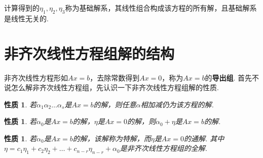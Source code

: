 \documentclass[12pt, a4paper, oneside]{ctexbook}
\newtheorem{quolity}[theorem]{性质}
\begin{document}
计算得到的$\eta_1, \eta_2, \eta_3$称为基础解系，其线性组合构成该方程的所有解，且基础解系是线性无关的. 

\section{非齐次线性方程组解的结构}

非齐次线性方程形如$Ax = b$，去除常数得到$Ax = 0$，称为$Ax = b$的\textbf{导出组}. 
首先不说怎么解非齐次线性方程组，先认识一下非齐次线性方程组解的性质. 

\begin{quolity}
    若$\alpha_1 \alpha_2 \dots \alpha_s$是$Ax=b$的解，则任意$\alpha$相加减仍为该方程的解. 
\end{quolity}

\begin{quolity}
    若$\alpha_0$是$Ax=b$的解，$\eta$是$Ax=0$的解，则$\alpha_0+\eta$是$Ax=b$的解. 
\end{quolity}

\begin{quolity}
    若$\alpha_0$是$Ax=b$的解，该解称为特解，而$\eta$是$Ax=0$的通解. 
    其中$\eta = c_1\eta_1 + c_2\eta_2 + \dots + c_{n-r}\eta_{n-r} + \alpha_0$是非齐次线性方程组的全解. 
\end{quolity}
\end{document}
